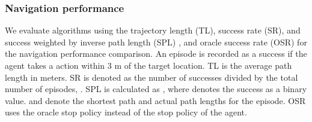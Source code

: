 \documentclass[10pt,twocolumn,letterpaper]{article}
\begin{document}
\subsubsection{Navigation performance}
\vspace{-0.15cm}
We evaluate algorithms using the trajectory length (TL), success rate (SR),
and success weighted by inverse path length (SPL)
\cite{anderson2018evaluation}, and oracle success rate (OSR) for the navigation performance comparison. An episode is recorded as a success if the agent takes a  action within 3 m of the target location. TL is the average path length in meters. SR is denoted as the number of successes divided by the total number of episodes, . SPL is calculated as , where  denotes the success as a binary value.  and  denote the shortest path and actual path lengths for the  episode. OSR uses the oracle stop policy instead of the stop policy of the agent.\vspace{-0.1cm}
\end{document}
